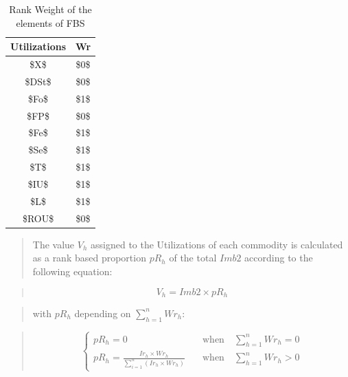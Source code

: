 \documentclass[]{article}
\begin{document}
\begin{table}

\caption{\label{tab:t10}Rank Weight of the elements of FBS}
\centering
\begin{tabular}[t]{c|c}
\hline
Utilizations & Wr\\
\hline
\$X\$ & \$0\$\\
\hline
\$DSt\$ & \$0\$\\
\hline
\$Fo\$ & \$1\$\\
\hline
\$FP\$ & \$0\$\\
\hline
\$Fe\$ & \$1\$\\
\hline
\$Se\$ & \$1\$\\
\hline
\$T\$ & \$1\$\\
\hline
\$IU\$ & \$1\$\\
\hline
\$L\$ & \$1\$\\
\hline
\$ROU\$ & \$0\$\\
\hline
\end{tabular}
\end{table}

\begin{quote}
The value \(V_{h}\) assigned to the Utilizations of each commodity is
calculated as a rank based proportion \(pR_{h}\) of the total \(Imb2\)
according to the following equation:
\end{quote}

\begin{quote}
\begin{equation}
\label{eq:inverseRank}
V_{h} = Imb2 \times pR_{h}
\end{equation}
\end{quote}

\begin{quote}
with \(pR_{h}\) depending on \(\sum \limits_{h=1}^n Wr_{h}\):
\end{quote}

\begin{quote}
\begin{equation}
\label{eq:weightRank}
\begin{cases}
pR_{h} = 0     & \quad \text{when} \quad \sum \limits_{h=1}^n Wr_{h} = 0\\
pR_{h} = \frac{Ir_{h}\times Wr_{h}}{\sum \limits_{i=1}^n\left(Ir_{h}\times Wr_{h}\right)}     & \quad \text{when} \quad \sum \limits_{h=1}^n Wr_{h} > 0 
\end{cases}
\end{equation}
\end{quote}

\begin{quote}
\end{quote}
\end{document}
